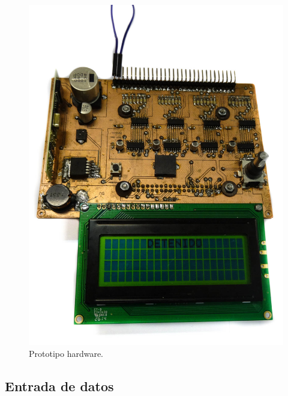 \begin{figure}[H]
	\noindent \begin{centering}
		\includegraphics[width=\linewidth*2/3]{capitulo6/pcb}
		\par\end{centering}
	\smallskip
	\caption{\label{fig:pcb} Prototipo hardware.}
\end{figure} 

\smallskip

\subsection{Entrada de datos}

\smallskip

